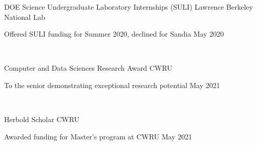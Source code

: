 \documentclass[10pt]{article}
\begin{document}
 {
	
{ 
	DOE Science Undergraduate Laboratory Internships (SULI)} 
\hspace*{0pt}\hfill Lawrence Berkeley National Lab

Offered SULI funding for Summer 2020, declined for Sandia \hspace*{0pt}\hfill May 2020

\

%
%
{ 
Computer and Data Sciences Research Award} 
\hspace*{0pt}\hfill CWRU 

To the senior demonstrating exceptional research potential \hspace*{0pt}\hfill May 2021

\

{ 
Herbold Scholar} 
\hspace*{0pt}\hfill CWRU 

Awarded funding for Master's program at CWRU \hspace*{0pt}\hfill May 2021

\
%
%



			
			
			
	}
\end{document}
